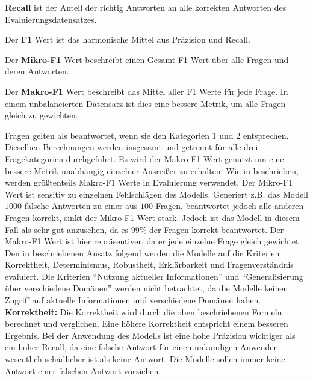 \begin{definition}
    \textbf{Recall} ist der Anteil der richtig Antworten an alle korrekten Antworten des Evaluierungsdatensatzes.
\end{definition}

\begin{definition}
    Der \textbf{F1} Wert ist das harmonische Mittel aus Präzision und Recall.
\end{definition}

\begin{definition}\label{def:micro-f1}
    Der \textbf{Mikro-F1} Wert beschreibt einen Gesamt-F1 Wert über alle Fragen und deren Antworten.
\end{definition}

\begin{definition}\label{def:macro-f1}
    Der \textbf{Makro-F1} Wert beschreibt das Mittel aller F1 Werte für jede Frage.
    In einem unbalancierten Datensatz ist dies eine bessere Metrik, um alle Fragen gleich zu gewichten.
\end{definition}

Fragen gelten als beantwortet, wenn sie den Kategorien 1 und 2 entsprechen.
Dieselben Berechnungen werden insgesamt und getrennt für alle drei Fragekategorien durchgeführt.
Es wird der Makro-F1 Wert genutzt um eine bessere Metrik unabhängig einzelner Ausreißer zu erhalten.
Wie in \citet{qald9} beschrieben, werden größtenteils Makro-F1 Werte in Evaluierung verwendet.
Der Mikro-F1 Wert ist sensitiv zu einzelnen Fehlschlägen des Modells.
Generiert z.B. das Modell $1000$ falsche Antworten zu einer aus $100$ Fragen, beantwortet jedoch alle anderen Fragen korrekt, sinkt der Mikro-F1 Wert stark.
Jedoch ist das Modell in diesem Fall als sehr gut anzusehen, da es $99\%$ der Fragen korrekt beantwortet.
Der Makro-F1 Wert ist hier repräsentiver, da er jede einzelne Frage gleich gewichtet.\\

Den in \citet{chatgpt_qas} beschriebenen Ansatz folgend werden die Modelle auf die Kriterien Korrektheit, Determinismus, Robustheit, Erklärbarkeit und Fragenverständnis evaluiert.
Die Kriterien \enquote{Nutzung aktueller Informationen} und \enquote{Generalisierung über verschiedene Domänen} werden nicht betrachtet, da die Modelle keinen Zugriff auf aktuelle Informationen und verschiedene Domänen haben.\\

\noindent\textbf{Korrektheit:}\newline
Die Korrektheit wird durch die oben beschriebenen Formeln berechnet und verglichen.
Eine höhere Korrektheit entspricht einem besseren Ergebnis.
Bei der Anwendung des Modells ist eine hohe Präzision wichtiger als ein hoher Recall, da eine falsche Antwort für einen unkundigen Anwender wesentlich schädlicher ist als keine Antwort.
Die Modelle sollen immer keine Antwort einer falschen Antwort vorziehen.\\

